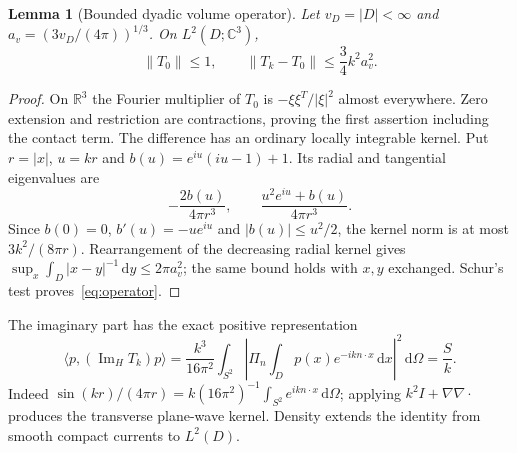\documentclass[11pt]{article}
\newtheorem{lemma}[theorem]{Lemma}
\newcommand{\ImH}{\operatorname{Im}_{\!H}}
\newcommand{\dd}{\,\mathrm{d}}
\newcommand{\ip}[2]{\langle #1,#2\rangle}
\newcommand{\norm}[1]{\lVert #1\rVert}
\newcommand{\abs}[1]{\lvert #1\rvert}
\begin{document}
\begin{lemma}[Bounded dyadic volume operator]\label{lem:operator}
Let $v_D=\abs D<\infty$ and $a_v=(3v_D/(4\pi))^{1/3}$. On $L^2(D;\mathbb C^3)$,
\begin{equation}\label{eq:operator}
 \norm{T_0}\leq1,\qquad
 \norm{T_k-T_0}\leq\frac34k^2a_v^2.
\end{equation}
\end{lemma}
\begin{proof}
On $\mathbb R^3$ the Fourier multiplier of $T_0$ is $-\xi\xi^T/\abs\xi^2$ almost everywhere. Zero extension and restriction are contractions, proving the first assertion including the contact term. The difference has an ordinary locally integrable kernel. Put $r=\abs x$, $u=kr$ and $b(u)=e^{iu}(iu-1)+1$. Its radial and tangential eigenvalues are
\[
 -\frac{2b(u)}{4\pi r^3},\qquad
 \frac{u^2e^{iu}+b(u)}{4\pi r^3}.
\]
Since $b(0)=0$, $b'(u)=-ue^{iu}$ and $\abs{b(u)}\leq u^2/2$, the kernel norm is at most $3k^2/(8\pi r)$. Rearrangement of the decreasing radial kernel gives $\sup_x\int_D\abs{x-y}^{-1}\dd y\leq2\pi a_v^2$; the same bound holds with $x,y$ exchanged. Schur's test proves~\eqref{eq:operator}.
\end{proof}

The imaginary part has the exact positive representation
\begin{equation}\label{eq:radiation-identity}
 \ip p{(\ImH T_k)p}
 =\frac{k^3}{16\pi^2}\int_{S^2}
 \left|\Pi_n\int_Dp(x)e^{-ikn\cdot x}\dd x\right|^2\dd\Omega
 =\frac Sk.
\end{equation}
Indeed $\sin(kr)/(4\pi r)=k(16\pi^2)^{-1}\int_{S^2}e^{ikn\cdot x}\dd\Omega$; applying $k^2I+\nabla\nabla\cdot$ produces the transverse plane-wave kernel. Density extends the identity from smooth compact currents to $L^2(D)$.
\end{document}

